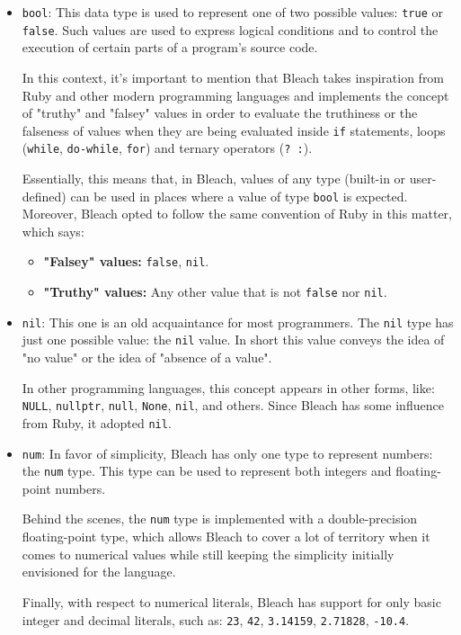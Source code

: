 \begin{itemize}
    \item \texttt{bool}: This data type is used to represent one of two possible values: \texttt{true} or \texttt{false}. Such values are used to express logical conditions and to control the execution of certain parts of a program's source code.
    
    In this context, it's important to mention that Bleach takes inspiration from Ruby and other modern programming languages and implements the concept of "truthy" and "falsey" values in order to evaluate the truthiness or the falseness of values when they are being evaluated inside \texttt{if} statements, loops (\texttt{while}, \texttt{do-while}, \texttt{for}) and ternary operators (\texttt{? :}).

    Essentially, this means that, in Bleach, values of any type (built-in or user-defined) can be used in places where a value of type \texttt{bool} is expected. Moreover, Bleach opted to follow the same convention of Ruby in this matter, which says:

    \begin{itemize}
        \item \textbf{"Falsey" values:} \texttt{false}, \texttt{nil}.
        \item \textbf{"Truthy" values:} Any other value that is not \texttt{false} nor \texttt{nil}.
    \end{itemize}
    
    \item \texttt{nil}: This one is an old acquaintance for most programmers. The \texttt{nil} type has just one possible value: the \texttt{nil} value. In short this value conveys the idea of "no value" or the idea of "absence of a value".

    In other programming languages, this concept appears in other forms, like: \texttt{NULL}, \texttt{nullptr}, \texttt{null}, \texttt{None}, \texttt{nil}, and others. Since Bleach has some influence from Ruby, it adopted \texttt{nil}.
    
    \item \texttt{num}: In favor of simplicity, Bleach has only one type to represent numbers: the \texttt{num} type. This type can be used to represent both integers and floating-point numbers.

    Behind the scenes, the \texttt{num} type is implemented with a double-precision floating-point type, which allows Bleach to cover a lot of territory when it comes to numerical values while still keeping the simplicity initially envisioned for the language.
    
    Finally, with respect to numerical literals, Bleach has support for only basic integer and decimal literals, such as: \texttt{23}, \texttt{42}, \texttt{3.14159}, \texttt{2.71828}, \texttt{-10.4}.
    
\end{itemize}

